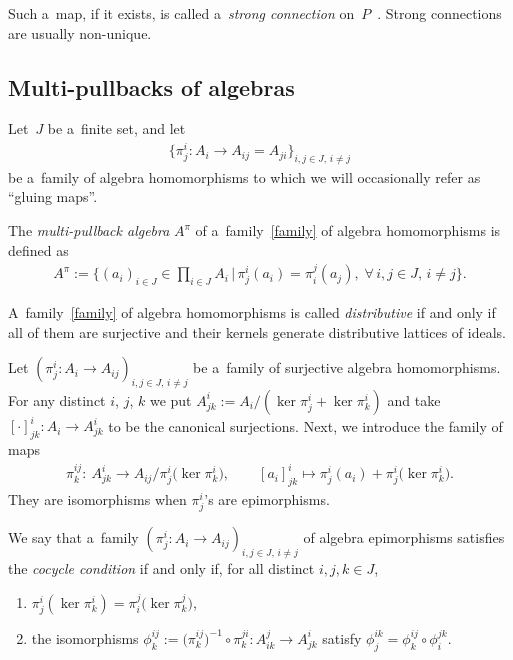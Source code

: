 Such a~map, if it exists, is called a~{\em strong connection} on~$P$~\cite{bh04,dgh01, h-pm96}.
Strong connections are usually non-unique.

\subsection{Multi-pullbacks of algebras}

Let~$J$ be a~f\/inite set, and let
\begin{gather}
\label{family}
\big\{\pi^i_j:A_i\longrightarrow A_{ij}=A_{ji}\big\}_{i,j\in J,\,i\neq j}
\end{gather}
be a~family of algebra homomorphisms to which we will occasionally refer as ``gluing maps''.
\begin{definition}
[\cite{CM2000,GK-P99}] The \emph{multi-pullback algebra} $A^\pi$ of a~family~\eqref{family} of algebra homomorphisms is
def\/ined as
\begin{gather*}
A^\pi:=\bigg\{ (a_i)_{i\in J}\in\prod\limits_{i\in J}A_i
\,
\bigg|
\,
\pi^i_j(a_i)=\pi^j_i(a_j),
\;
\forall\, i,j\in J,\, i\neq j \bigg\}.
\end{gather*}
\end{definition}

\begin{definition} A~family~\eqref{family} of algebra homomorphisms is called \emph{distributive} if and only if all of
them are surjective and their kernels generate distributive lattices of ideals.
\end{definition}

Let $(\pi^i_j:A_i\rightarrow A_{ij})_{i,j\in J,\,i\neq j}$ be a~family of surjective algebra homomorphisms.
For any distinct $i$, $j$, $k$ we put $A^i_{jk}:=A_i/(\ker\pi^i_j+\ker\pi^i_k)$ and take $[\cdot]^i_{jk}:A_i\rightarrow
A^i_{jk}$ to be the canonical surjections.
Next, we introduce the family of maps
\begin{gather*}
\pi^{ij}_k: \ A^i_{jk}\longrightarrow A_{ij}/\pi^i_j\big(\ker\pi^i_k\big),
\qquad
[a_i]^i_{jk}\longmapsto\pi^i_j(a_i)+\pi^i_j\big(\ker\pi^i_k\big).
\end{gather*}
They are isomorphisms when $\pi^i_j$'s are epimorphisms.

\begin{definition}
\label{cocycle-def}
We say \cite[Proposition~9]{CM2000} that a~family $(\pi^i_j:A_i\rightarrow A_{ij})_{i,j\in J,\,i\neq j}$ of algebra
epimorphisms satisf\/ies the {\em cocycle condition} if and only if, for all distinct $i,j,k\in J$,
\begin{enumerate}\itemsep=0pt
\item[1)] $\pi^i_j(\ker\pi^i_k)=\pi^j_i\big(\ker\pi^j_k\big)$,
\item[2)] the isomorphisms $\phi^{ij}_k:=\big(\pi^{ij}_k\big)^{-1}\circ\pi^{ji}_k:A^j_{ik}\rightarrow A^i_{jk}$ satisfy
$\phi^{ik}_j=\phi^{ij}_k\circ\phi^{jk}_i$.
\end{enumerate}
\end{definition}

